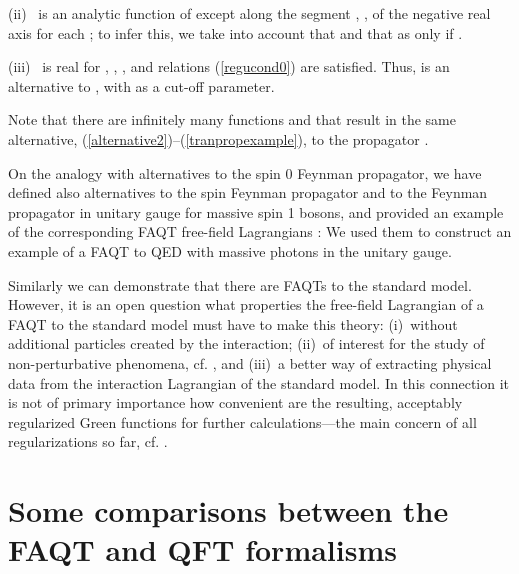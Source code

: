 \documentclass[a4paper,12pt]{article}
\providecommand{\half}{{\textstyle{1\over2}}}
\providecommand{\prop}{\widetilde{\Delta}}
\providecommand{\propF}{\prop_F}
\providecommand{\altreg}{f_{A}}
\begin{document}
(ii)~\myHighlight{$\altreg(z)$}\coordHE{} is an analytic function of \coordHE{} except along the segment \coordHE{}, \coordHE{}, of the negative real axis for each \coordHE{}; to infer this, we take into account that \coordHE{} and that \coordHE{} as \coordHE{} only if \coordHE{}. 

(iii)~\myHighlight{$\altreg(z)$}\coordHE{} is real for \coordHE{}, \myHighlight{$\altreg(-m^2) = 1$}\coordHE{}, \myHighlight{$\sup_z (1 + |z|^{3/2}) |\altreg(z)| < \infty$}\coordHE{}, and relations (\ref{regucond0}) are satisfied. Thus, \myHighlight{$\prop(k)$}\coordHE{} is an alternative to \myHighlight{$\propF(k)$}\coordHE{}, with \coordHE{} as a cut-off parameter. 

Note that there are infinitely many functions \coordHE{} and \coordHE{} that result in the same alternative, (\ref{alternative2})--(\ref{tranpropexample}), to the propagator \myHighlight{$\propF(k)$}\coordHE{}.

On the analogy with alternatives to the spin 0 Feynman propagator, we have defined also alternatives to the spin \myHighlight{$\half$}\coordHE{} Feynman propagator and to the Feynman propagator in unitary gauge for massive spin 1 bosons, and provided an example of the corresponding FAQT free-field Lagrangians \cite{mi003}: We used them to construct an example of a FAQT to QED with massive photons in the unitary gauge.

Similarly we can demonstrate that there are FAQTs to the standard model. However, it is an open question what properties the free-field Lagrangian of a FAQT to the standard model must have to make this theory: (i)~without additional particles created by the interaction; (ii)~of interest for the study of non-perturbative phenomena, cf. \cite{Gupta}, and (iii)~a better way of extracting physical data from the interaction Lagrangian of the standard model. In this connection it is not of primary importance how convenient are the resulting, acceptably regularized Green functions for further calculations---the main concern of all regularizations so far, cf. \cite{Deminov}.

\section{Some comparisons between the FAQT and QFT formalisms}
\label{seccomp}
\end{document}
